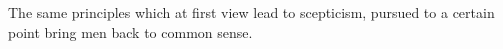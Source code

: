 \documentclass[MAIN]{subfiles}
\begin{document}
The same principles which at first view lead to scepticism, pursued to a certain point bring men back to common sense.
\end{document}
